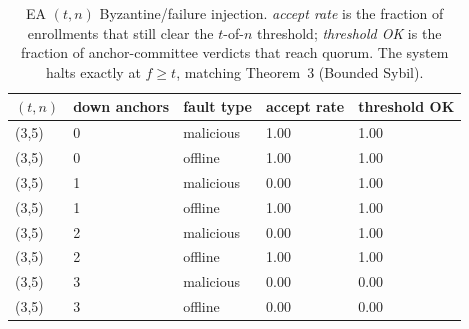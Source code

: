 \begin{table}[t]
\centering
\caption{EA $(t,n)$ Byzantine/failure injection. \emph{accept rate} is the fraction of enrollments that still clear the $t$-of-$n$ threshold; \emph{threshold OK} is the fraction of anchor-committee verdicts that reach quorum. The system halts exactly at $f\ge t$, matching Theorem~3 (Bounded Sybil).}
\label{tab:ea-fault}
\small
\begin{tabular}{lllll}
\toprule
$(t,n)$ & down anchors & fault type & accept rate & threshold OK \\
\midrule
(3,5) & 0 & malicious & 1.00 & 1.00 \\
(3,5) & 0 & offline & 1.00 & 1.00 \\
(3,5) & 1 & malicious & 0.00 & 1.00 \\
(3,5) & 1 & offline & 1.00 & 1.00 \\
(3,5) & 2 & malicious & 0.00 & 1.00 \\
(3,5) & 2 & offline & 1.00 & 1.00 \\
(3,5) & 3 & malicious & 0.00 & 0.00 \\
(3,5) & 3 & offline & 0.00 & 0.00 \\
\bottomrule
\end{tabular}
\end{table}
